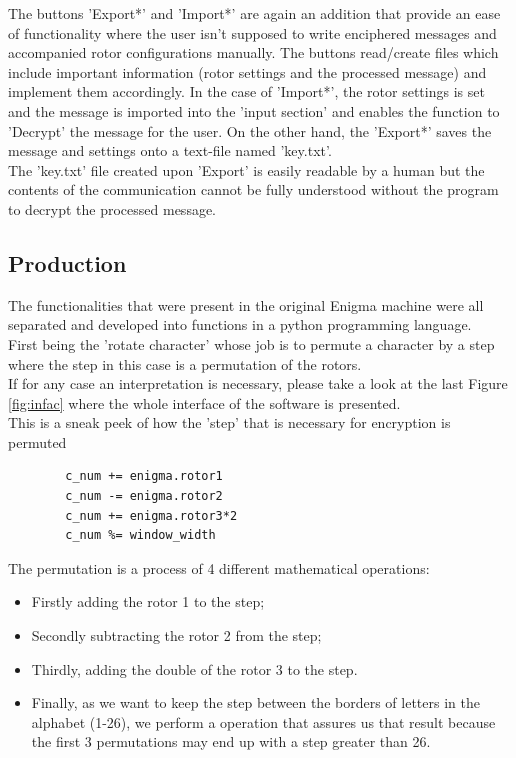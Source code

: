 \documentclass[conference,compsoc]{IEEEtran}
\begin{document}
The buttons 'Export*' and 'Import*' are again an addition that provide an ease of functionality where the user isn't supposed to write enciphered messages and accompanied rotor configurations manually. The buttons read/create files which include important information (rotor settings and the processed message) and implement them accordingly. In the case of 'Import*', the rotor settings is set and the message is imported into the 'input section' and enables the function to 'Decrypt' the message for the user. On the other hand, the 'Export*' saves the message and settings onto a text-file named 'key.txt'.\\

The 'key.txt' file created upon 'Export' is easily readable by a human but the contents of the communication cannot be fully understood without the program to decrypt the processed message.\\ 

\subsection{Production}

The functionalities that were present in the original Enigma machine were all separated and developed into functions in a python programming language.\\
First being the 'rotate character' whose job is to permute a character by a step where the step in this case is a permutation of the rotors.\\
If for any case an interpretation is necessary, please take a look at the last Figure \ref{fig:infac} where the whole interface of the software is presented.\\

This is a sneak peek of how the 'step' that is necessary for encryption is permuted
\begin{verbatim}
        c_num += enigma.rotor1
        c_num -= enigma.rotor2
        c_num += enigma.rotor3*2
        c_num %= window_width
\end{verbatim} 
The permutation is a process of 4 different mathematical operations:\\
\begin{itemize}
    \item Firstly adding the rotor 1 to the step;\\
    \item Secondly subtracting the rotor 2 from the step;\\
    \item Thirdly, adding the double of the rotor 3 to the step.\\
    \item Finally, as we want to keep the step between the borders of letters in the alphabet (1-26), we perform a operation that assures us that result because the first 3 permutations may end up with a step greater than 26.\\
\end{itemize}
\end{document}
